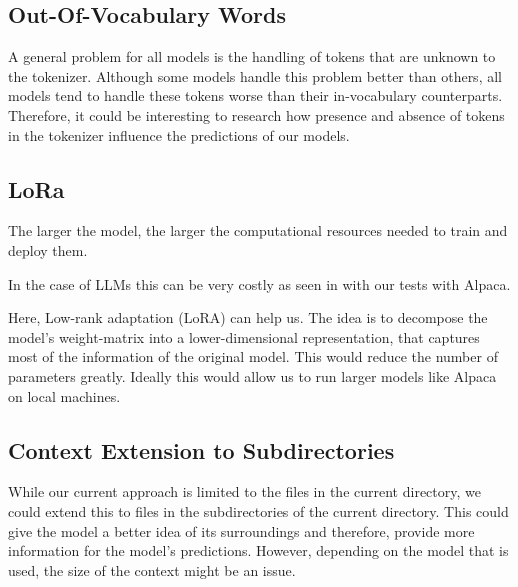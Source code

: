 \subsection{Out-Of-Vocabulary Words}


A general problem for all models is the handling of tokens that are unknown to the tokenizer. Although some models handle this problem better than others, all models tend to handle these tokens worse than their in-vocabulary counterparts. Therefore, it could be interesting to research how  presence and absence of tokens in the tokenizer influence the predictions of our models.



\subsection{LoRa}

The larger the model, the larger the computational resources needed to train and deploy them.

In the case of LLMs this can be very costly as seen in with our tests with Alpaca. 

Here,  Low-rank adaptation (LoRA)\cite{hu2021lora} can help us. The idea is to decompose the model's weight-matrix into a lower-dimensional representation, that captures most of the information of the original model. This would reduce the number of parameters greatly. Ideally this would allow us to run larger models like Alpaca on local machines.


\subsection{Context Extension to Subdirectories}


While our current approach is limited to the files in the current directory, we could extend this to files in the subdirectories of the current directory. This could give the model a better idea of its surroundings and therefore, provide more information for the model's predictions. However, depending on the model that is used, the size of the context might be an issue.



